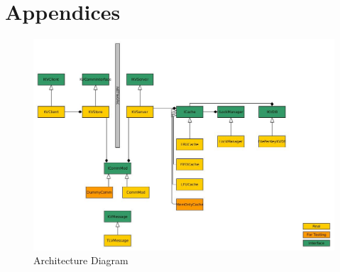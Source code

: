 \documentclass[10pt]{article}
\begin{document}
\newpage

\section{Appendices}

\begin{figure}[H]
\centering
\includegraphics[scale=0.50]{architecture}
\caption{Architecture Diagram}
\label{arch}
\end{figure}
\end{document}

